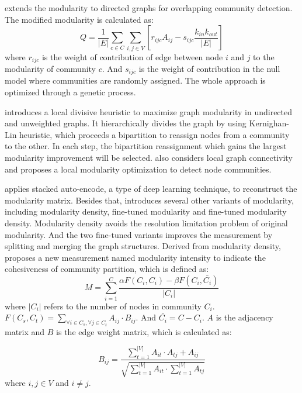\cite{nicosia2009extending} extends the modularity to directed graphs for overlapping community detection. The modified modularity is calculated as:
\begin{equation}
	Q= \frac{1}{|E|}\sum_{c \in C}\sum_{i,j \in V}[r_{ijc}A_{ij}- s_{ijc}\frac{k_{in}k_{out}}{|E|}]
\end{equation}
where $r_{ijc}$ is the weight of contribution of edge between node $i$ and $j$ to the modularity of community $c$. And $s_{ijc}$ is the weight of contribution in the null model where communities are randomly assigned. The whole approach is optimized through a genetic process.

\cite{cafieri2011locally} introduces a local divisive heuristic to maximize graph modularity in undirected and unweighted graphs. It hierarchically divides the graph by using Kernighan-Lin heuristic, which proceeds a bipartition to reassign nodes from a community to the other. In each step, the bipartition reassignment which gains the largest modularity improvement will be selected. \cite{xiang2016local} also considers local graph connectivity and proposes a local modularity optimization to detect node communities.

 \cite{yang2016modularity} applies stacked auto-encode, a type of deep learning technique, to reconstruct the modularity matrix. Besides that, \cite{chen2014community} introduces several other variants of modularity, including modularity density,  fine-tuned modularity and fine-tuned modularity density.  Modularity density avoids the resolution limitation problem of original modularity. And the two fine-tuned variants improves the measurement by splitting and merging the graph structures. Derived from modularity density, \cite{sun2013maximizing} proposes a new measurement named modularity intensity to indicate the cohesiveness of community partition, which is defined as:
\begin{equation}
	M = \sum_{i=1}^{C}\frac{\alpha F(C_i,C_i) - \beta F(C_i,\bar{C_i})}{|C_i|}
\end{equation}
where $|C_{i}|$ refers to the number of nodes in community $C_i$. $F(C_s,C_t) = \sum_{\forall i\in C_s, \forall j\in C_t} A_{ij}\cdot B_{ij}$. And $\bar{C_i} = C - C_i$. $A$ is the adjacency matrix and $B$ is the edge weight matrix, which is calculated as:

\begin{equation}
	B_{ij} = \frac{\sum_{t=1}^{|V|}A_{it}\cdot A_{tj} + A_{ij}}{\sqrt{\sum_{t=1}^{|V|}A_{it} \cdot \sum_{t=1}^{|V|}A_{tj}}}
\end{equation}
 where $i,j \in V$ and $i \neq j$.
 

